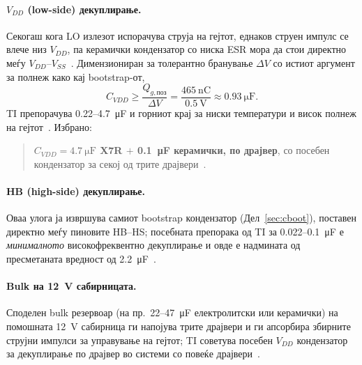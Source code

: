 \documentclass[journal,onecolumn,11pt]{IEEEtran}
\begin{document}
\paragraph{$V_{DD}$ (low-side) декуплирање.} Секогаш кога LO излезот испорачува струја
на гејтот, еднаков струен импулс се влече низ $V_{DD}$, па керамички кондензатор со
ниска ESR мора да стои директно меѓу $V_{DD}$--$V_{SS}$~\cite{ucc27211}.
Димензиониран за толерантно бранување $\Delta V$ со истиот аргумент за полнеж како кај
bootstrap-от,
\begin{equation}
C_{VDD}\ge\frac{Q_{g,\text{поз}}}{\Delta V}=\frac{\SI{465}{\nano\coulomb}}{\SI{0.5}{\volt}}\approx\SI{0.93}{\micro\farad}.
\end{equation}
TI препорачува \mbox{0.22--\SI{4.7}{\micro\farad}} и горниот крај за ниски температури
и висок полнеж на гејтот~\cite{ucc27211}. Избрано:
\begin{quote}
\textbf{$C_{VDD}=\SI{4.7}{\micro\farad}$ X7R $+$ \SI{0.1}{\micro\farad} керамички, по
драјвер}, со посебен кондензатор за секој од трите драјвери~\cite{ucc27211}.
\end{quote}

\paragraph{HB (high-side) декуплирање.} Оваа улога ја извршува самиот bootstrap
кондензатор (Дел~\ref{sec:cboot}), поставен директно меѓу пиновите HB--HS; посебната
препорака од TI за \mbox{0.022--\SI{0.1}{\micro\farad}} е \emph{минималното}
високофреквентно декуплирање и овде е надмината од пресметаната вредност од
\SI{2.2}{\micro\farad}~\cite{ucc27211}.

\paragraph{Bulk на \SI{12}{\volt} сабирницата.} Споделен bulk резервоар (на пр.\
\mbox{22--\SI{47}{\micro\farad}} електролитски или керамички) на помошната
\SI{12}{\volt} сабирница ги напојува трите драјвери и ги апсорбира збирните струјни
импулси за управување на гејтот; TI советува посебен $V_{DD}$ кондензатор за
декуплирање по драјвер во системи со повеќе драјвери~\cite{ucc27211}.
\end{document}
